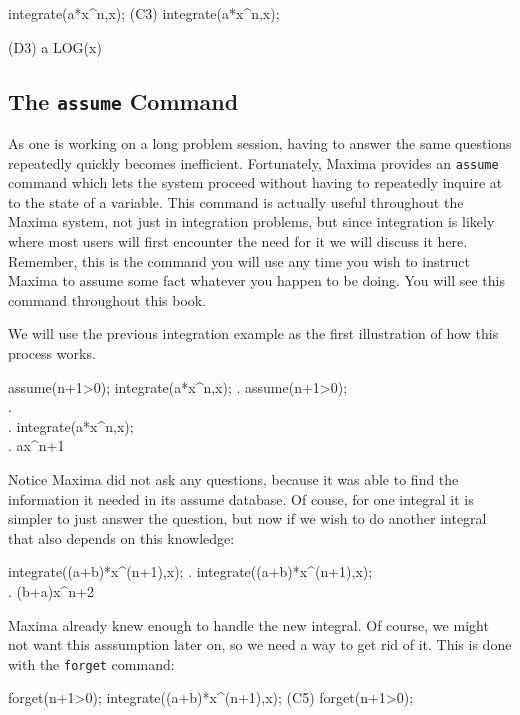 \beginmaximasession
integrate(a*x^n,x);
\maximasession
(C3) integrate(a*x^n,x);

(D3)                               a LOG(x)
\endmaximasession

\subsection{The {\tt assume} Command}

As one is working on a long problem session, having to answer the same
questions repeatedly quickly becomes inefficient.  Fortunately, Maxima
provides an {\tt assume} command which lets the system proceed without
having to repeatedly inquire at to the state of a variable.  This command
is actually useful throughout the Maxima system, not just in integration
problems, but since integration is likely where most users will first
encounter the need for it we will discuss it here.  Remember, this 
is the command you will use any time you wish to instruct Maxima to
assume some fact whatever you happen to be doing.  You will see this
command throughout this book.

We will use the previous integration example as the first illustration of
how this process works.

\beginmaximasession
assume(n+1>0);
integrate(a*x^n,x);
\maximatexsession
{}.  assume(n+1>0); \\
.   \left[ n>-1 \right]  \\
.  integrate(a*x^n,x); \\
.   {{a\*x^{n+1}}} \\
\endmaximasession

Notice Maxima did not ask any questions, because it was able to find the
information it needed in its assume database.  Of couse, for one integral
it is simpler to just answer the question, but now if we wish to do another
integral that also depends on this knowledge:

\beginmaximasession
integrate((a+b)*x^(n+1),x);
\maximatexsession
{}.  integrate((a+b)*x^(n+1),x); \\
.   {{\left(b+a\right)\*x^{n+2}}} \\
\endmaximasession

Maxima already knew enough to handle the new integral.  Of course, we 
might not want this asssumption later on, so we need a way to get rid
of it.  This is done with the {\tt forget} command:

\beginmaximasession
forget(n+1>0);
integrate((a+b)*x^(n+1),x);
\maximasession
(C5) forget(n+1>0);


